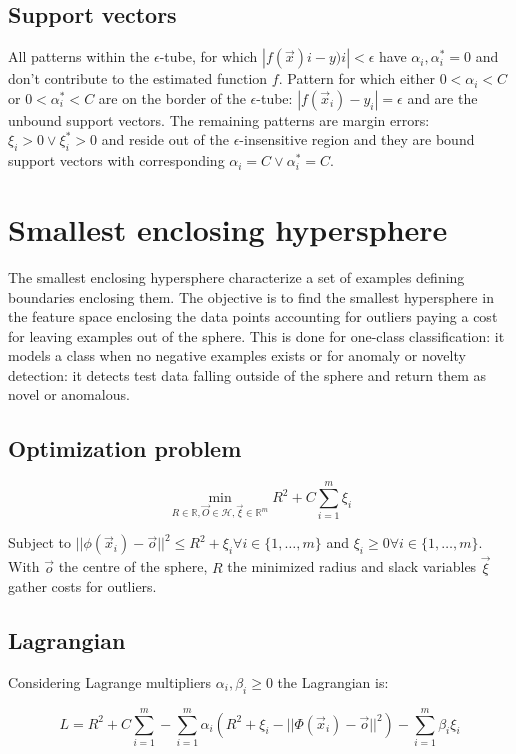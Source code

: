 	\subsection{Support vectors}
	All patterns within the $\epsilon$-tube, for which $|f(\vec{x})i-y)i|<\epsilon$ have $\alpha_i, \alpha_i^* = 0$ and don't contribute to the estimated function $f$.
	Pattern for which either $0<\alpha_i<C$ or $0<\alpha_i^*<C$ are on the border of the $\epsilon$-tube: $|f(\vec{x}_i)-y_i| = \epsilon$ and are the unbound support vectors.
	The remaining patterns are margin errors: $\xi_i>0\lor\xi_i^*>0$ and reside out of the $\epsilon$-insensitive region and they are bound support vectors with corresponding $\alpha_i=C\lor\alpha_i^* = C$.

\section{Smallest enclosing hypersphere}
The smallest enclosing hypersphere characterize a set of examples defining boundaries enclosing them.
The objective is to find the smallest hypersphere in the feature space enclosing the data points accounting for outliers paying a cost for leaving examples out of the sphere.
This is done for one-class classification: it models a class when no negative examples exists or for anomaly or novelty detection: it detects test data falling outside of the sphere and return them as novel or anomalous.

	\subsection{Optimization problem}

	$$\min\limits_{R\in\mathbb{R}, \vec{O}\in\mathcal{H},\vec{\xi}\in\mathbb{R}^m} R^2+C\sum\limits_{i=1}^m\xi_i$$

	Subject to $||\phi(\vec{x}_i)-\vec{o}||^2\le R^2+\xi_i\forall i\in\{1, \dots, m\}$ and $\xi_i\ge 0\forall i\in\{1, \dots, m\}$.
	With $\vec{o}$ the centre of the  sphere, $R$ the minimized radius and slack variables $\vec{\xi}$ gather costs for outliers.

	\subsection{Lagrangian}
	Considering Lagrange multipliers $\alpha_i,\beta_i\ge 0$ the Lagrangian is:

	$$L = R^2 + C\sum\limits_{i=1}^m-\sum\limits_{i=1}^m\alpha_i(R^2+\xi_i-||\Phi(\vec{x}_i)-\vec{o}||^2)-\sum\limits_{i=1}^m\beta_i\xi_i$$

